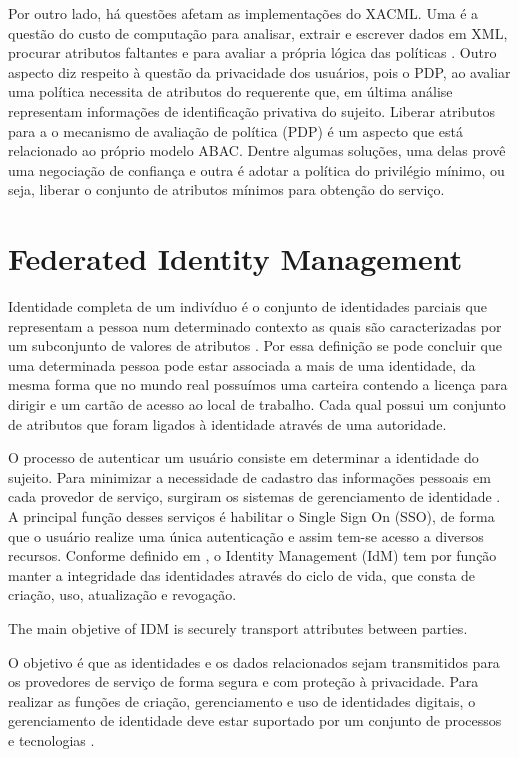 \documentclass{doublecol-new}
\begin{document}
Por outro lado, há questões afetam as implementações do XACML. Uma é a questão do custo de computação para analisar, extrair e escrever dados em XML, procurar atributos faltantes e para avaliar a própria lógica das políticas \cite{gollmann2011compsecurity}. Outro aspecto diz respeito à questão da privacidade dos usuários, pois o PDP, ao avaliar uma política necessita de atributos do requerente que, em última análise representam informações de identificação privativa do sujeito. Liberar atributos para a o mecanismo de avaliação de política (PDP) é um aspecto que está relacionado ao próprio modelo ABAC. Dentre algumas soluções, uma delas provê uma negociação de confiança e outra é adotar a política do privilégio mínimo, ou seja, liberar o conjunto de atributos mínimos para obtenção do serviço.
	
	
\section{Federated Identity Management}\label{sec:gerenciamento-identidades}
	
Identidade completa de um indivíduo é o conjunto de identidades parciais que representam a pessoa num determinado contexto as quais são caracterizadas por um subconjunto de valores de atributos \cite{pfitzmann2010terminology}. Por essa definição se pode concluir que uma determinada pessoa pode estar associada a mais de uma identidade, da mesma forma que no mundo real possuímos uma carteira contendo a licença para dirigir e um cartão de acesso ao local de trabalho. Cada qual possui um conjunto de atributos que foram ligados à identidade através de uma autoridade.

	
O processo de autenticar um usuário consiste em determinar a identidade do sujeito. Para minimizar a necessidade de cadastro das informações pessoais em cada provedor de serviço, surgiram os sistemas de gerenciamento de identidade \cite{el2007survey} \cite{cao2010survey}. A principal função desses serviços é habilitar o Single Sign On (SSO), de forma que o usuário realize uma única autenticação e assim tem-se acesso a diversos recursos. Conforme definido em \cite{bertino2011identity}, o Identity Management (IdM) tem por função manter a integridade das identidades através do ciclo de vida, que consta de criação, uso, atualização e revogação. 

The main objetive of IDM is securely transport attributes between parties.

O objetivo é que as identidades e os dados relacionados sejam transmitidos para os provedores de serviço de forma segura e com proteção à privacidade. Para realizar as funções de criação, gerenciamento e uso de identidades digitais, o gerenciamento de identidade deve estar suportado por um conjunto de processos e tecnologias \cite{cao2010survey}.
	
\end{document}
